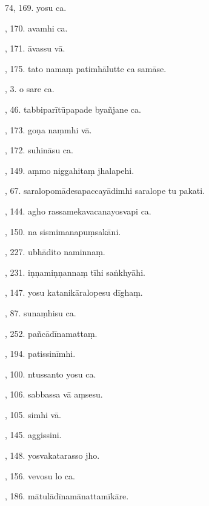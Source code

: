 74, 169. yosu ca.\hfill \pageref{sut:74}\par {}, 170. avamhi ca.\hfill \pageref{sut:75}\par {}, 171. āvassu vā.\hfill \pageref{sut:76}\par {}, 175. tato namaṃ patimhālutte ca samāse.\hfill \pageref{sut:77}\par {}, 3. o sare ca.\hfill \pageref{sut:78}\par {}, 46. tabbiparītūpapade byañjane ca.\hfill \pageref{sut:79}\par {}, 173. goṇa naṃmhi vā.\hfill \pageref{sut:80}\par {}, 172. suhināsu ca.\hfill \pageref{sut:81}\par {}, 149. aṃmo niggahitaṃ jhalapehi.\hfill \pageref{sut:82}\par {}, 67. saralopomādesapaccayādimhi saralope tu pakati.\hfill \pageref{sut:83}\par {}, 144. agho rassamekavacanayosvapi ca.\hfill \pageref{sut:84}\par {}, 150. na sismimanapuṃsakāni.\hfill \pageref{sut:85}\par {}, 227. ubhādito naminnaṃ.\hfill \pageref{sut:86}\par {}, 231. iṇṇamiṇṇannaṃ tīhi saṅkhyāhi.\hfill \pageref{sut:87}\par {}, 147. yosu katanikāralopesu dīghaṃ.\hfill \pageref{sut:88}\par {}, 87. sunaṃhisu ca.\hfill \pageref{sut:89}\par {}, 252. pañcādīnamattaṃ.\hfill \pageref{sut:90}\par {}, 194. patissinīmhi.\hfill \pageref{sut:91}\par {}, 100. ntussanto yosu ca.\hfill \pageref{sut:92}\par {}, 106. sabbassa vā aṃsesu.\hfill \pageref{sut:93}\par {}, 105. simhi vā.\hfill \pageref{sut:94}\par {}, 145. aggissini.\hfill \pageref{sut:95}\par {}, 148. yosvakatarasso jho.\hfill \pageref{sut:96}\par {}, 156. vevosu lo ca.\hfill \pageref{sut:97}\par {}, 186. mātulādīnamānattamīkāre.\hfill \pageref{sut:98}\par \noindent
